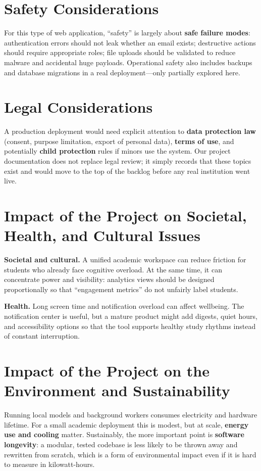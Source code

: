 \section{Safety Considerations}
For this type of web application, ``safety'' is largely about \textbf{safe failure modes}: authentication errors should not leak whether an email exists; destructive actions should require appropriate roles; file uploads should be validated to reduce malware and accidental huge payloads. Operational safety also includes backups and database migrations in a real deployment---only partially explored here.

\section{Legal Considerations}
A production deployment would need explicit attention to \textbf{data protection law} (consent, purpose limitation, export of personal data), \textbf{terms of use}, and potentially \textbf{child protection} rules if minors use the system. Our project documentation does not replace legal review; it simply records that these topics exist and would move to the top of the backlog before any real institution went live.

\section{Impact of the Project on Societal, Health, and Cultural Issues}
\textbf{Societal and cultural.} A unified academic workspace can reduce friction for students who already face cognitive overload. At the same time, it can concentrate power and visibility: analytics views should be designed proportionally so that ``engagement metrics'' do not unfairly label students.

\textbf{Health.} Long screen time and notification overload can affect wellbeing. The notification center is useful, but a mature product might add digests, quiet hours, and accessibility options so that the tool supports healthy study rhythms instead of constant interruption.

\section{Impact of the Project on the Environment and Sustainability}
Running local models and background workers consumes electricity and hardware lifetime. For a small academic deployment this is modest, but at scale, \textbf{energy use and cooling} matter. Sustainably, the more important point is \textbf{software longevity}: a modular, tested codebase is less likely to be thrown away and rewritten from scratch, which is a form of environmental impact even if it is hard to measure in kilowatt-hours.
